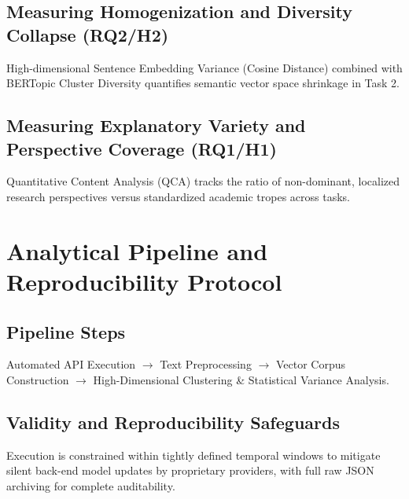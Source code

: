 \subsection{Measuring Homogenization and Diversity Collapse (RQ2/H2)}
High-dimensional Sentence Embedding Variance (Cosine Distance) combined with BERTopic Cluster Diversity quantifies semantic vector space shrinkage in Task 2.

\subsection{Measuring Explanatory Variety and Perspective Coverage (RQ1/H1)}
Quantitative Content Analysis (QCA) tracks the ratio of non-dominant, localized research perspectives versus standardized academic tropes across tasks.

\section{Analytical Pipeline and Reproducibility Protocol}

\subsection{Pipeline Steps}
Automated API Execution $\rightarrow$ Text Preprocessing $\rightarrow$ Vector Corpus Construction $\rightarrow$ High-Dimensional Clustering \& Statistical Variance Analysis.

\subsection{Validity and Reproducibility Safeguards}
Execution is constrained within tightly defined temporal windows to mitigate silent back-end model updates by proprietary providers, with full raw JSON archiving for complete auditability.
